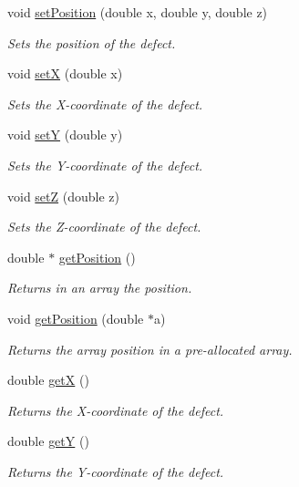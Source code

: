 \begin{DoxyCompactItemize}
void \hyperlink{classDefect_ad1a6acd8399d2ecabb7ce2b77623bbec}{set\-Position} (double x, double y, double z)
\begin{DoxyCompactList}\small\item\em Sets the position of the defect. \end{DoxyCompactList}\item 
void \hyperlink{classDefect_a5a65f73da6a572d9e7109b31239e441d}{set\-X} (double x)
\begin{DoxyCompactList}\small\item\em Sets the X-\/coordinate of the defect. \end{DoxyCompactList}\item 
void \hyperlink{classDefect_a268606391a4eaee3de029d2005648b6f}{set\-Y} (double y)
\begin{DoxyCompactList}\small\item\em Sets the Y-\/coordinate of the defect. \end{DoxyCompactList}\item 
void \hyperlink{classDefect_abb0b16c44a1b04d782f5c5f598b49d5b}{set\-Z} (double z)
\begin{DoxyCompactList}\small\item\em Sets the Z-\/coordinate of the defect. \end{DoxyCompactList}\item 
double $\ast$ \hyperlink{classDefect_a6842fba3ad14032766ccf0437afcbced}{get\-Position} ()
\begin{DoxyCompactList}\small\item\em Returns in an array the position. \end{DoxyCompactList}\item 
void \hyperlink{classDefect_aace5c752b85c368631746abc3d5bd714}{get\-Position} (double $\ast$a)
\begin{DoxyCompactList}\small\item\em Returns the array position in a pre-\/allocated array. \end{DoxyCompactList}\item 
double \hyperlink{classDefect_a01b96c453c13db82b5835682e1849dc0}{get\-X} ()
\begin{DoxyCompactList}\small\item\em Returns the X-\/coordinate of the defect. \end{DoxyCompactList}\item 
double \hyperlink{classDefect_a9ea8df3b4c621762a327813056e63911}{get\-Y} ()
\begin{DoxyCompactList}\small\item\em Returns the Y-\/coordinate of the defect. \end{DoxyCompactList}\item 

\end{DoxyCompactItemize}
